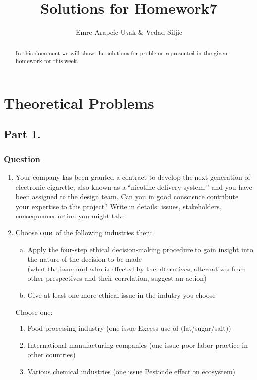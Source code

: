 \documentclass[a4paper, 10pt]{article}
\title{Solutions for Homework7}
\author{Emre Arapcic-Uvak & Vedad Siljic}
\date{}
\begin{document}
	\maketitle
	\vspace{5mm}
	
	\begin{abstract}
		\begin{center}
			\noindent In this document we will show the solutions for problems represented in the given homework for this week.
		\end{center}
	\end{abstract}
	\pagebreak
	
	\tableofcontents
	\pagebreak
	
	\section{Theoretical Problems}
		\subsection{Part 1.}
			\subsubsection{Question}
				\begin{enumerate}
					\item \noindent Your company has been granted a contract to develop the next generation of electronic cigarette, also 
					known as a “nicotine delivery system,” and you have been assigned to the design team. Can you in good 
					conscience contribute your expertise to this project? Write in details: issues, stakeholders, 
					consequences action you might take
					
					\item Choose \textbf{one}~of the following industries then:
					\begin{enumerate} [a.]
						\item Apply the four-step ethical decision-making procedure to gain insight into the nature of the decision to be made\\
						\noindent (what the issue and who is effected by the alterntives, alternatives from other prespectives and their correlation, suggest an action)
						
						\item Give at least one more ethical issue in the indutry you choose
					\end{enumerate}
					\noindent Choose one:
					\begin{enumerate}
						\item Food processing industry (one issue Excess use of (fat/sugar/salt))
						\item International manufacturing companies (one issue poor labor practice in other countries)
						\item Various chemical industries (one issue Pesticide effect on ecosystem)
					\end{enumerate}
				\end{enumerate}
			
\end{document}
